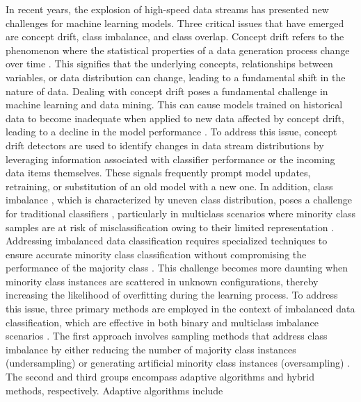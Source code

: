   In recent years, the explosion of high-speed data streams has presented new challenges for machine learning models. Three critical
  issues that have emerged are concept drift, class imbalance, and class overlap. Concept drift refers to the phenomenon where the
  statistical properties of a data generation process change over time \cite{yang2021concept}\cite{dong2019multistream}. This signifies that the underlying concepts, relationships
  between variables, or data distribution can change, leading to a fundamental shift in the nature of data. Dealing with concept drift
  poses a fundamental challenge in machine learning and data mining. This can cause models trained on historical data to become
  inadequate when applied to new data affected by concept drift, leading to a decline in the model performance \cite{dong2019multistream}. To address this issue,
  concept drift detectors are used to identify changes in data stream distributions by leveraging information associated with classifier
  performance or the incoming data items themselves. These signals frequently prompt model updates, retraining, or substitution of an
  old model with a new one.
  In addition, class imbalance \cite{dong2019multistream}\cite{pan2009survey}, which is characterized by uneven class distribution, poses a challenge for traditional classifiers
  \cite{zhuang2020comprehensive}, particularly in multiclass scenarios where minority class samples are at risk of misclassification owing to their limited representation \cite{wang2018systematic}. Addressing imbalanced data classification requires specialized techniques to ensure accurate minority class classification without compromising the performance of the majority class \cite{sun2009classification}\cite{charte2015addressing}\cite{charte2015mlsmote}. This challenge becomes more daunting when minority class instances are scattered in unknown configurations, thereby increasing the likelihood of overfitting during the learning process. To
  address this issue, three primary methods are employed in the context of imbalanced data classification, which are effective in both
  binary and multiclass imbalance scenarios \cite{daniels2017addressing}. The first approach involves sampling methods that address class imbalance by either
  reducing the number of majority class instances (undersampling) or generating artificial minority class instances (oversampling)
  \cite{liu2018making}\cite{japkowicz1995novelty}\cite{lopez2012analysis}. The second and third groups encompass adaptive algorithms and hybrid methods, respectively. Adaptive algorithms include
